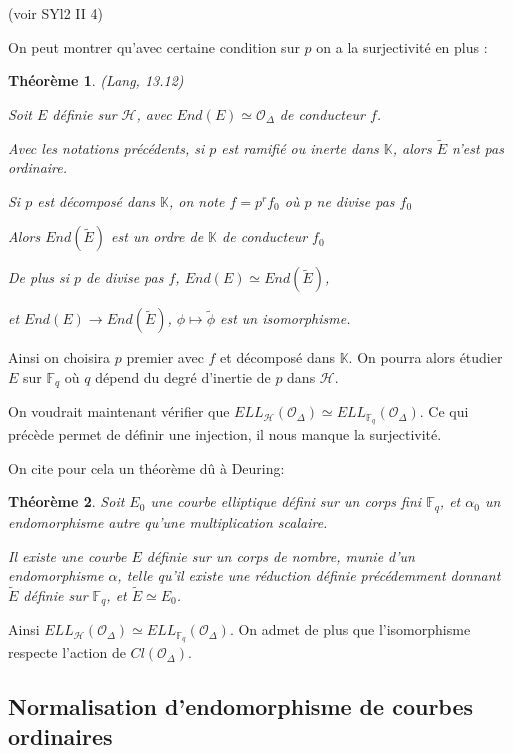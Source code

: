 \documentclass{article}
\newcommand{\K}[0]{\mathbb{K}}
\newcommand{\OR}[0]{\mathcal{O}}
\newcommand{\HR}[0]{\mathcal{H}}
\newcommand{\F}[0]{\mathbb{F}}
\newtheorem{The}{Théorème}[section]
\begin{document}
(voir SYl2 II 4)

On peut montrer qu'avec certaine condition sur $p$ on a la surjectivité en plus :

\begin{The} (Lang, 13.12)
	
	Soit $E$ définie sur $\HR$, avec $End(E)\simeq\OR_{\Delta}$ de conducteur $f$.
	
	Avec les notations précédents, si $p$ est ramifié ou inerte dans $\K$, alors $\tilde{E}$ n'est pas ordinaire. 
	
	Si $p$ est décomposé dans $\K$, on note $f = p^r f_{0}$ où $p$ ne divise pas $f_{0}$
	
	Alors $End(\tilde{E})$ est un ordre de $\K$ de conducteur $f_{0}$
	
	De plus si $p$ de divise pas $f$, $End(E)\simeq End(\tilde{E})$,
	
	et $End(E)\rightarrow End(\tilde{E})$, $\phi\mapsto\tilde{\phi}$ est un isomorphisme.
	
\end{The}

Ainsi on choisira $p$ premier avec $f$ et décomposé dans $\K$. On pourra alors étudier $E$ sur $\F_{q}$ où $q$ dépend du degré d'inertie de $p$ dans $\HR$.

On voudrait maintenant vérifier que $ELL_{\HR}(\OR_{\Delta})\simeq ELL_{\F_{q}}(\OR_{\Delta})$. Ce qui précède permet de définir une injection, il nous manque la surjectivité.

On cite pour cela un théorème dû à Deuring:

\begin{The}
	Soit $E_{0}$ une courbe elliptique défini sur un corps fini $\F_{q}$, et $\alpha_{0}$ un endomorphisme autre qu'une multiplication scalaire.
	
	Il existe une courbe $E$ définie sur un corps de nombre, munie d'un endomorphisme $\alpha$, telle qu'il existe une réduction définie précédemment donnant $\tilde{E}$ définie sur $\F_{q}$, et $\tilde{E}\simeq E_{0}$.
\end{The}

Ainsi $ELL_{\HR}(\OR_{\Delta})\simeq ELL_{\F_{q}}(\OR_{\Delta})$. On admet de plus que l'isomorphisme respecte l'action de $Cl(\OR_{\Delta})$.




\subsection{Normalisation d'endomorphisme de courbes ordinaires}
\end{document}
